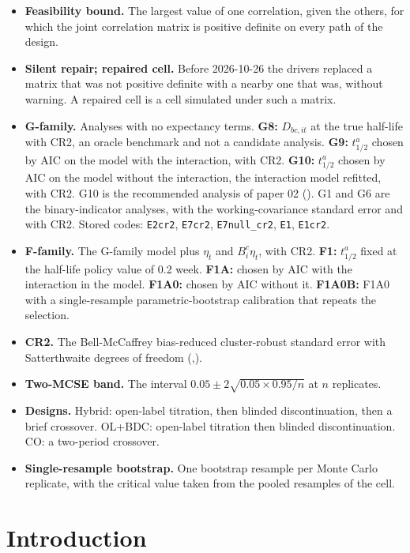 \documentclass[
  11pt,
]{article}
\begin{document}
\begin{itemize}
  \(B^c_i w_t^2\).
\item
  \textbf{Feasibility bound.} The largest value of one correlation, given
  the others, for which the joint correlation matrix is positive
  definite on every path of the design.
\item
  \textbf{Silent repair; repaired cell.} Before 2026-10-26 the drivers
  replaced a matrix that was not positive definite with a nearby one
  that was, without warning. A repaired cell is a cell simulated
  under such a matrix.
\item
  \textbf{G-family.} Analyses with no expectancy terms. \textbf{G8:}
  \(D_{bc,it}\) at the true half-life with CR2, an oracle benchmark and
  not a candidate analysis. \textbf{G9:} \(t^a_{1/2}\) chosen by AIC on the
  model with the interaction, with CR2. \textbf{G10:} \(t^a_{1/2}\) chosen by
  AIC on the model without the interaction, the interaction model
  refitted, with CR2. G10 is the recommended analysis of paper 02
  (). G1 and G6 are the binary-indicator analyses,
  with the working-covariance standard error and with CR2. Stored codes: \texttt{E2cr2}, \texttt{E7cr2},
  \texttt{E7null\_cr2}, \texttt{E1}, \texttt{E1cr2}.
\item
  \textbf{F-family.} The G-family model plus \(\eta_t\) and \(B^c_i\eta_t\), with
  CR2. \textbf{F1:} \(t^a_{1/2}\) fixed at the half-life policy value of 0.2
  week. \textbf{F1A:} chosen by AIC with the interaction in the model.
  \textbf{F1A0:} chosen by AIC without it. \textbf{F1A0B:} F1A0 with a
  single-resample parametric-bootstrap calibration that repeats the
  selection.
\item
  \textbf{CR2.} The Bell-McCaffrey bias-reduced cluster-robust standard
  error with Satterthwaite degrees of freedom
  (,).
\item
  \textbf{Two-MCSE band.} The interval \(0.05 \pm 2\sqrt{0.05 \times
  0.95/n}\) at \(n\) replicates.
\item
  \textbf{Designs.} Hybrid: open-label titration, then blinded
  discontinuation, then a brief crossover. OL+BDC: open-label
  titration then blinded discontinuation. CO: a two-period crossover.
\item
  \textbf{Single-resample bootstrap.} One bootstrap resample per Monte
  Carlo replicate, with the critical value taken from the pooled
  resamples of the cell.
\end{itemize}

\section{Introduction}\label{sec-intro}
\end{document}
